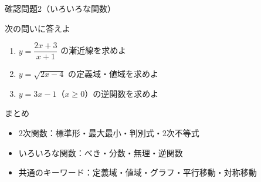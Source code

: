 \documentclass[aspectratio=43,professionalfonts,handout]{beamer}
\begin{document}
\begin{frame}{確認問題2（いろいろな関数）}
  \begin{block}{次の問いに答えよ}
    \begin{enumerate}
      \item $y=\dfrac{2x+3}{x+1}$ の漸近線を求めよ
      \item $y=\sqrt{2x-4}$ の定義域・値域を求めよ
      \item $y=3x-1$（$x\geq 0$）の逆関数を求めよ
    \end{enumerate}
  \end{block}
\end{frame}

\begin{frame}{まとめ}
  \begin{itemize}
    \item 2次関数：標準形・最大最小・判別式・2次不等式
    \item いろいろな関数：べき・分数・無理・逆関数
    \item 共通のキーワード：定義域・値域・グラフ・平行移動・対称移動
  \end{itemize}
\end{frame}
\end{document}
